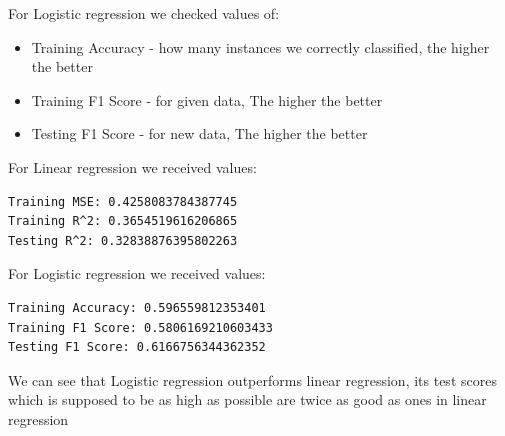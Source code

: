 \documentclass{article}[12pt]
\begin{document}
For Logistic regression we checked values of:
\begin{itemize}
    \item Training Accuracy - how many instances we correctly classified, the higher the better 
    \item Training F1 Score - for given data, The higher the better 
    \item Testing F1 Score - for new data, The higher the better
\end{itemize}

For Linear regression we received values:
\begin{lstlisting}[language=bash]
Training MSE: 0.4258083784387745
Training R^2: 0.3654519616206865
Testing R^2: 0.32838876395802263
\end{lstlisting}

For Logistic regression we received values:
\begin{lstlisting}[language=bash]
Training Accuracy: 0.596559812353401
Training F1 Score: 0.5806169210603433
Testing F1 Score: 0.6166756344362352
\end{lstlisting}
We can see that Logistic regression outperforms linear regression, its test scores which is supposed to be as high as possible are twice as good as ones in linear regression 
\end{document}
